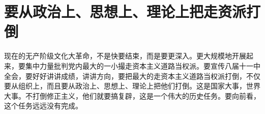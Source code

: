 \section[要从政治上、思想上、理论上把走资派打倒（一九六七年八月）]{要从政治上、思想上、理论上把走资派打倒}


现在的无产阶级文化大革命，不是快要结束，而是要更深入。更大规模地开展起来，要集中力量批判党内最大的一小撮走资本主义道路当权派。要宣传八届十一中全会，要好好讲讲成绩，讲讲方向，要把最大的走资本主义道路当权派打倒，不仅要从组织上，而且要从政治上、思想上、理论上把他们打倒。这是国家大事，世界大事。不打倒修正主义，他们就要搞复辟，这是一个伟大的历史任务。要向前看，这个任务远远没有完成。

